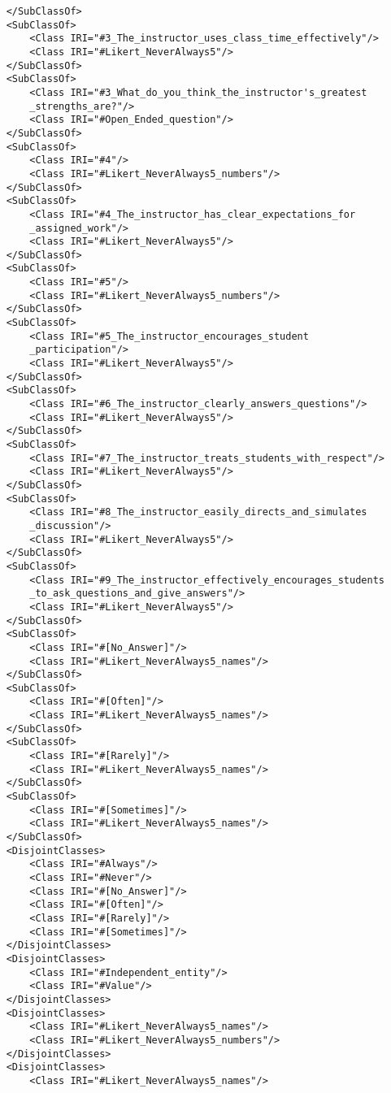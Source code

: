 \begin{lstlisting}
    </SubClassOf>
    <SubClassOf>
        <Class IRI="#3_The_instructor_uses_class_time_effectively"/>
        <Class IRI="#Likert_NeverAlways5"/>
    </SubClassOf>
    <SubClassOf>
        <Class IRI="#3_What_do_you_think_the_instructor's_greatest
        _strengths_are?"/>
        <Class IRI="#Open_Ended_question"/>
    </SubClassOf>
    <SubClassOf>
        <Class IRI="#4"/>
        <Class IRI="#Likert_NeverAlways5_numbers"/>
    </SubClassOf>
    <SubClassOf>
        <Class IRI="#4_The_instructor_has_clear_expectations_for
        _assigned_work"/>
        <Class IRI="#Likert_NeverAlways5"/>
    </SubClassOf>
    <SubClassOf>
        <Class IRI="#5"/>
        <Class IRI="#Likert_NeverAlways5_numbers"/>
    </SubClassOf>
    <SubClassOf>
        <Class IRI="#5_The_instructor_encourages_student
        _participation"/>
        <Class IRI="#Likert_NeverAlways5"/>
    </SubClassOf>
    <SubClassOf>
        <Class IRI="#6_The_instructor_clearly_answers_questions"/>
        <Class IRI="#Likert_NeverAlways5"/>
    </SubClassOf>
    <SubClassOf>
        <Class IRI="#7_The_instructor_treats_students_with_respect"/>
        <Class IRI="#Likert_NeverAlways5"/>
    </SubClassOf>
    <SubClassOf>
        <Class IRI="#8_The_instructor_easily_directs_and_simulates
        _discussion"/>
        <Class IRI="#Likert_NeverAlways5"/>
    </SubClassOf>
    <SubClassOf>
        <Class IRI="#9_The_instructor_effectively_encourages_students
        _to_ask_questions_and_give_answers"/>
        <Class IRI="#Likert_NeverAlways5"/>
    </SubClassOf>
    <SubClassOf>
        <Class IRI="#[No_Answer]"/>
        <Class IRI="#Likert_NeverAlways5_names"/>
    </SubClassOf>
    <SubClassOf>
        <Class IRI="#[Often]"/>
        <Class IRI="#Likert_NeverAlways5_names"/>
    </SubClassOf>
    <SubClassOf>
        <Class IRI="#[Rarely]"/>
        <Class IRI="#Likert_NeverAlways5_names"/>
    </SubClassOf>
    <SubClassOf>
        <Class IRI="#[Sometimes]"/>
        <Class IRI="#Likert_NeverAlways5_names"/>
    </SubClassOf>
    <DisjointClasses>
        <Class IRI="#Always"/>
        <Class IRI="#Never"/>
        <Class IRI="#[No_Answer]"/>
        <Class IRI="#[Often]"/>
        <Class IRI="#[Rarely]"/>
        <Class IRI="#[Sometimes]"/>
    </DisjointClasses>
    <DisjointClasses>
        <Class IRI="#Independent_entity"/>
        <Class IRI="#Value"/>
    </DisjointClasses>
    <DisjointClasses>
        <Class IRI="#Likert_NeverAlways5_names"/>
        <Class IRI="#Likert_NeverAlways5_numbers"/>
    </DisjointClasses>
    <DisjointClasses>
        <Class IRI="#Likert_NeverAlways5_names"/>

\end{lstlisting}
